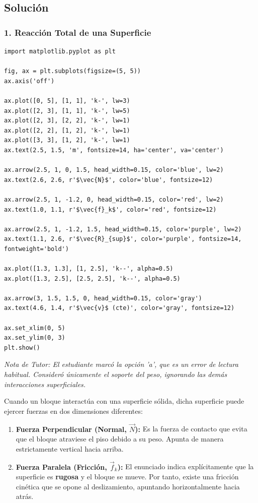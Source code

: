 \documentclass[12pt, a4paper]{article}
\begin{document}
\subsection*{Solución}

\subsubsection*{1. Reacción Total de una Superficie}

\begin{verbatim}
import matplotlib.pyplot as plt

fig, ax = plt.subplots(figsize=(5, 5))
ax.axis('off')

ax.plot([0, 5], [1, 1], 'k-', lw=3)
ax.plot([2, 3], [1, 1], 'k-', lw=5) 
ax.plot([2, 3], [2, 2], 'k-', lw=1)
ax.plot([2, 2], [1, 2], 'k-', lw=1)
ax.plot([3, 3], [1, 2], 'k-', lw=1)
ax.text(2.5, 1.5, 'm', fontsize=14, ha='center', va='center')

ax.arrow(2.5, 1, 0, 1.5, head_width=0.15, color='blue', lw=2)
ax.text(2.6, 2.6, r'$\vec{N}$', color='blue', fontsize=12)

ax.arrow(2.5, 1, -1.2, 0, head_width=0.15, color='red', lw=2)
ax.text(1.0, 1.1, r'$\vec{f}_k$', color='red', fontsize=12)

ax.arrow(2.5, 1, -1.2, 1.5, head_width=0.15, color='purple', lw=2)
ax.text(1.1, 2.6, r'$\vec{R}_{sup}$', color='purple', fontsize=14, fontweight='bold')

ax.plot([1.3, 1.3], [1, 2.5], 'k--', alpha=0.5)
ax.plot([1.3, 2.5], [2.5, 2.5], 'k--', alpha=0.5)

ax.arrow(3, 1.5, 1.5, 0, head_width=0.15, color='gray')
ax.text(4.6, 1.4, r'$\vec{v}$ (cte)', color='gray', fontsize=12)

ax.set_xlim(0, 5)
ax.set_ylim(0, 3)
plt.show()
\end{verbatim}

\textit{Nota de Tutor: El estudiante marcó la opción 'a', que es un error de lectura habitual. Consideró únicamente el soporte del peso, ignorando las demás interacciones superficiales.}

Cuando un bloque interactúa con una superficie sólida, dicha superficie puede ejercer fuerzas en dos dimensiones diferentes:
\begin{enumerate}
    \item \textbf{Fuerza Perpendicular (Normal, $\vec{N}$):} Es la fuerza de contacto que evita que el bloque atraviese el piso debido a su peso. Apunta de manera estrictamente vertical hacia arriba.
    \item \textbf{Fuerza Paralela (Fricción, $\vec{f}_k$):} El enunciado indica explícitamente que la superficie es \textbf{rugosa} y el bloque se mueve. Por tanto, existe una fricción cinética que se opone al deslizamiento, apuntando horizontalmente hacia atrás.
\end{enumerate}
\end{document}
